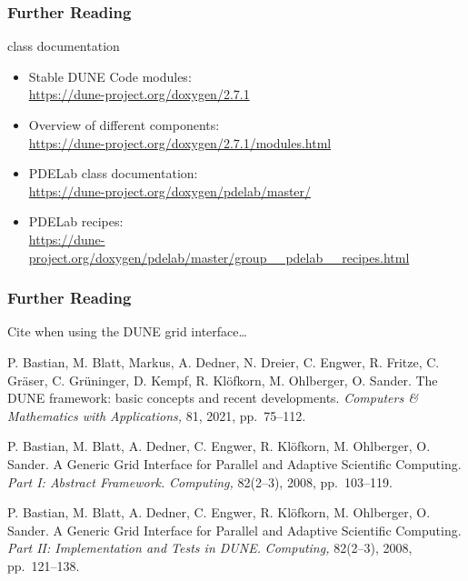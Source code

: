 \documentclass[aspectratio=169,11pt]{beamer}
\theoremstyle{definition}
\begin{document}
\begin{frame}
  \frametitle{Further Reading}

   class documentation

  \begin{itemize}
  \item Stable DUNE Code modules:\\ \url{https://dune-project.org/doxygen/2.7.1}
    \bigskip
  \item Overview of different components:\\
    \url{https://dune-project.org/doxygen/2.7.1/modules.html}
    \bigskip
  \item PDELab class documentation:\\
    \url{https://dune-project.org/doxygen/pdelab/master/}
    \bigskip
  \item PDELab recipes:\\
    \url{https://dune-project.org/doxygen/pdelab/master/group__pdelab__recipes.html}
  \end{itemize}
  
\end{frame}

\begin{frame} \frametitle<presentation>{Further Reading}
    \small
    Cite when using the DUNE grid interface\ldots
    \begingroup
    \renewcommand{\section}[2]{}%
    \begin{thebibliography}{}

      P. Bastian, M. Blatt, Markus, A. Dedner, N. Dreier, C. Engwer, R. Fritze, C. Gr{\"a}ser, C. Gr{\"u}ninger, D. Kempf, R. Kl{\"o}fkorn, M. Ohlberger, O. Sander.
      \newblock The DUNE framework: basic concepts and recent developments.
      \newblock \emph{Computers \& Mathematics with Applications,} 81, 2021, pp.~75--112.

P. Bastian, M. Blatt, A. Dedner, C. Engwer, R. Klöfkorn, M. Ohlberger,
O. Sander.
\newblock A Generic Grid Interface for Parallel and Adaptive
Scientific Computing.
\emph{Part I: Abstract Framework.}
\newblock \emph{Computing,} 82(2--3), 2008, pp.~103--119.

P. Bastian, M. Blatt, A. Dedner, C. Engwer, R. Klöfkorn, M. Ohlberger,
O. Sander.
\newblock A Generic Grid Interface for Parallel and Adaptive
Scientific Computing.
\emph{Part II: Implementation and Tests in DUNE.}
\newblock \emph{Computing,} 82(2--3), 2008, pp.~121--138.

\end{thebibliography}
    \endgroup
\end{frame}
\end{document}
